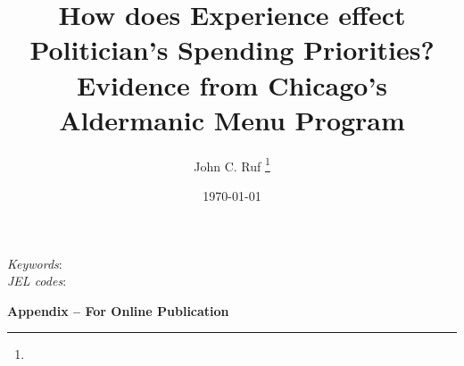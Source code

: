 \documentclass[11pt]{article}
\title{How does Experience effect Politician's Spending Priorities? Evidence from Chicago's Aldermanic Menu Program}
\author{John C. Ruf \thanks{\rufemail}}
\date{\today}
\renewcommand{\=}[1]{\stackrel{#1}{=}} %
\theoremstyle{definition}
\begin{document}

\maketitle

\begin{abstract}

\end{abstract}
\vspace{1cm}
{\small
\noindent \textit{Keywords}:  \\
\textit{JEL codes}: 
}
\thispagestyle{empty}
\newpage
\setcounter{page}{1}


%
%
%
%









{}

\newpage
\clearpage

\begin{center} \Large \textbf{Appendix -- For Online Publication} \end{center}
\appendix
{}


%
%
\end{document}
